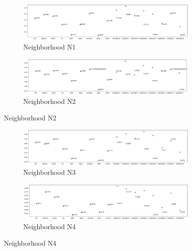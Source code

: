 \begin{figure}[h!]
    \centering
    \begin{subfigure}{0.496\textwidth}
        \includegraphics[width=0.99\textwidth]{figures/neighborhood-N1.png}
        \caption{Neighborhood N1}
        \label{fig:neighborhood-n1}
    \end{subfigure}
    \begin{subfigure}{0.496\textwidth}
        \includegraphics[width=0.99\textwidth]{figures/neighborhood-N2.png}
        \caption{Neighborhood N2}
        \label{fig:neighborhood-n2}
    \end{subfigure}
\end{figure}
\begin{figure}[h!]\ContinuedFloat
    \centering
    \begin{subfigure}{0.496\textwidth}
        \includegraphics[width=0.99\textwidth]{figures/neighborhood-N3.png}
        \caption{Neighborhood N3}
        \label{fig:neighborhood-n3}
    \end{subfigure}
    \begin{subfigure}{0.496\textwidth}
        \includegraphics[width=0.99\textwidth]{figures/neighborhood-N4.png}
        \caption{Neighborhood N4}
        \label{fig:neighborhood-n4}
    \end{subfigure}
\end{figure}
